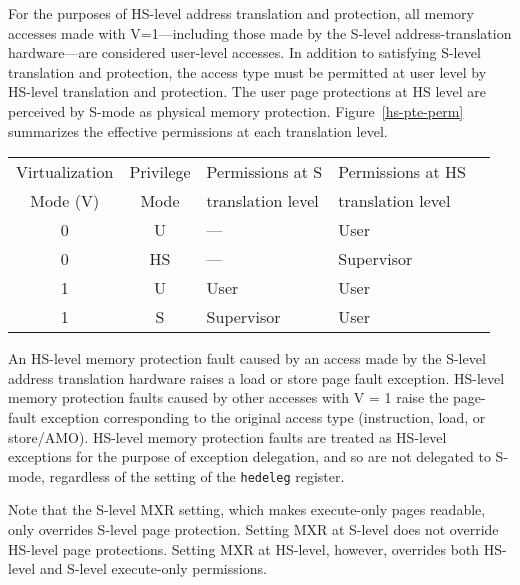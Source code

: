 For the purposes of HS-level address translation and protection, all memory
accesses made with V=1---including those made by the S-level
address-translation hardware---are considered user-level accesses.  In
addition to satisfying S-level translation and protection, the access type
must be permitted at user level by HS-level translation and protection.
The user page protections at HS level are perceived by S-mode as physical
memory protection.  Figure~\ref{hs-pte-perm} summarizes the effective
permissions at each translation level.

\begin{table*}[h!]
\begin{center}
\begin{tabular}{|c|c||l|l|l|}
  \hline
   Virtualization & Privilege & Permissions at S    & Permissions at HS \\
   Mode (V)       & Mode      & translation level   & translation level \\ \hline
   0              & U         & ---                 & User \\
   0              & HS        & ---                 & Supervisor \\
  \hline
   1              & U         & User                & User \\
   1              & S         & Supervisor          & User \\
  \hline
 \end{tabular}
\end{center}
\caption{Effective virtual-memory permissions at each address-translation level.}
\label{hs-pte-perm}
\end{table*}

An HS-level memory protection fault caused by an access made by the
S-level address translation hardware raises a load or store page
fault exception.  HS-level memory protection faults caused by other
accesses with V = 1 raise the page-fault exception corresponding to
the original access type (instruction, load, or store/AMO).  HS-level
memory protection faults are treated as HS-level exceptions for the purpose of
exception delegation, and so are not delegated to S-mode, regardless of the
setting of the {\tt hedeleg} register.

Note that the S-level MXR setting, which makes execute-only pages readable,
only overrides S-level page protection.  Setting MXR at S-level does not override
HS-level page protections.  Setting MXR at HS-level, however, overrides
both HS-level and S-level execute-only permissions.

